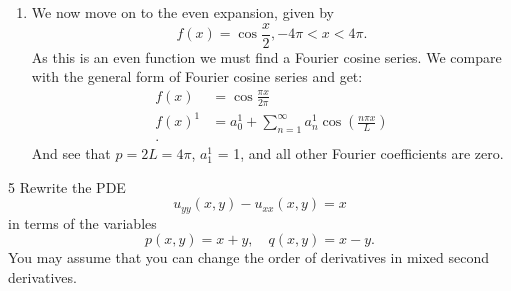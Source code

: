 \begin{derivation}
\begin{enumerate}
\begin{align*}
    &= \frac{2(n \cos (n \pi) - \sin (\pi n) )+ 1}{2 \pi \left( n^2 - 1 \right)}
  .\end{align*}
  I.e. the period $p^{0} = 2L = 2 \pi$ and the Fourier coefficients are
  \begin{align*}
    a_0^{0} &= \frac{1}{\pi} \\
    a_n^{0} &= \frac{2 \left( \cos (\pi n) - n \sin (\pi n) + 1 \right)}{2\pi \left( n^2 - 1 \right)} \\
    b_n^{0} &= \frac{2 \left( n \cos (n \pi) - \sin (n \pi ) \right) + 1}{2 \pi \left( n^2 - 1 \right)}
  .\end{align*}

\item We now move on to the even expansion, given by
  \begin{equation*}
    f(x) = \cos \frac{x}{2}, - 4\pi < x < 4\pi
  .\end{equation*}
  As this is an even function we must find a Fourier cosine series.
  We compare with the general form of Fourier cosine series and get:
  \begin{align*}
    f(x) &= \cos \frac{\pi x}{2 \pi} \\
    f(x)^{1} &= a_0^{1} + \sum_{n = 1}^{\infty} a_n^{1} \cos \left( \frac{n \pi x}{L} \right)\\
  .\end{align*}
  And see that $p = 2L = 4\pi$, $a_1^{1}$ = 1, and all other Fourier coefficients are zero.
\end{enumerate}
\end{derivation}


\begin{problem}{5}
  Rewrite the PDE
  \begin{equation*}
    u_{yy}(x,y) - u_{x x}(x,y) = x
  \end{equation*}
  in terms of the variables
  \begin{equation*}
    p(x,y) = x + y, \quad q(x,y) = x -y
  .\end{equation*}
  You may assume that you can change the order of derivatives in mixed second derivatives.
\end{problem}

